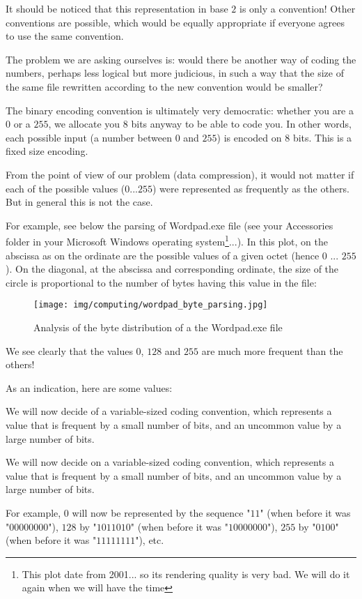 	It should be noticed that this representation in base $2$ is only a convention! Other conventions are possible, which would be equally appropriate if everyone agrees to use the same convention.

	The problem we are asking ourselves is: would there be another way of coding the numbers, perhaps less logical but more judicious, in such a way that the size of the same file rewritten according to the new convention would be smaller?

	The binary encoding convention is ultimately very democratic: whether you are a $0$ or a $255$, we allocate you $8$ bits anyway to be able to code you. In other words, each possible input (a number between $0$ and $255$) is encoded on $8$ bits. This is a fixed size encoding.

	From the point of view of our problem (data compression), it would not matter if each of the possible values ($0$...$255$) were represented as frequently as the others. But in general this is not the case.

	For example, see below the parsing of Wordpad.exe file (see your Accessories folder in your Microsoft Windows operating system\footnote{This plot date from 2001... so its rendering quality is very bad. We will do it again when we will have the time}...). In this plot, on the abscissa as on the ordinate are the possible values of a given octet (hence $0$ ... $255$). On the diagonal, at the abscissa and corresponding ordinate, the size of the circle is proportional to the number of bytes having this value in the file:
	\begin{figure}[H]
		\centering
		\texttt{[image: img/computing/wordpad\_byte\_parsing.jpg]}
		\caption[]{Analysis of the byte distribution of a the Wordpad.exe file}
	\end{figure}
	We see clearly that the values $0$, $128$ and $255$ are much more frequent than the others!

	As an indication, here are some values:
	
	We will now decide of a variable-sized coding convention, which represents a value that is frequent by a small number of bits, and an uncommon value by a large number of bits.
	
	We will now decide on a variable-sized coding convention, which represents a value that is frequent by a small number of bits, and an uncommon value by a large number of bits.

	For example, $0$ will now be represented by the sequence "$11$" (when before it was "$00000000$"), $128$ by "$1011010$" (when before it was "$10000000$"), $255$ by "$0100$" (when before it was "$11111111$"), etc.

